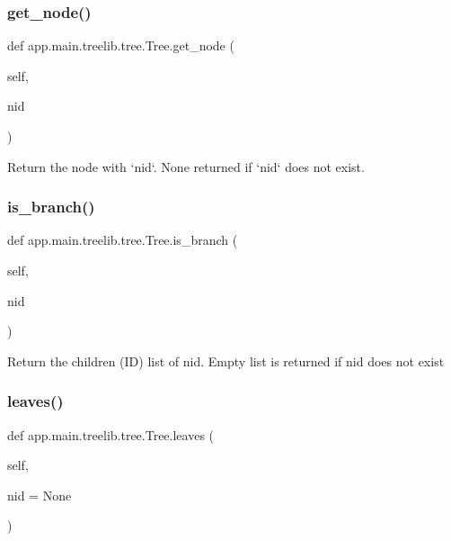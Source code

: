 \subsubsection{\texorpdfstring{get\+\_\+node()}{get\_node()}}
{\footnotesize\ttfamily def app.\+main.\+treelib.\+tree.\+Tree.\+get\+\_\+node (\begin{DoxyParamCaption}\item[{}]{self,  }\item[{}]{nid }\end{DoxyParamCaption})}

\begin{DoxyVerb}Return the node with `nid`. None returned if `nid` does not exist.\end{DoxyVerb}
 \mbox{\label{classapp_1_1main_1_1treelib_1_1tree_1_1Tree_ad4d32e2665abec898618604bc706feaa}} 
\subsubsection{\texorpdfstring{is\+\_\+branch()}{is\_branch()}}
{\footnotesize\ttfamily def app.\+main.\+treelib.\+tree.\+Tree.\+is\+\_\+branch (\begin{DoxyParamCaption}\item[{}]{self,  }\item[{}]{nid }\end{DoxyParamCaption})}

\begin{DoxyVerb}Return the children (ID) list of nid.
Empty list is returned if nid does not exist
\end{DoxyVerb}
 \mbox{\label{classapp_1_1main_1_1treelib_1_1tree_1_1Tree_a5ec4d13cd3bde4b97040c6e9bbf3253e}} 
\subsubsection{\texorpdfstring{leaves()}{leaves()}}
{\footnotesize\ttfamily def app.\+main.\+treelib.\+tree.\+Tree.\+leaves (\begin{DoxyParamCaption}\item[{}]{self,  }\item[{}]{nid = {\ttfamily None} }\end{DoxyParamCaption})}

